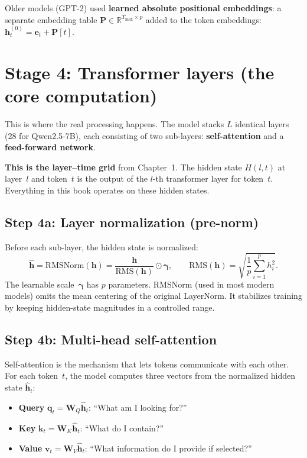\documentclass[11pt, twoside, openright]{memoir}
\begin{document}
Older models (GPT-2) used \textbf{learned absolute positional embeddings}:
a separate embedding table $\mathbf{P} \in \mathbb{R}^{T_{\max} \times p}$
added to the token embeddings:
$\mathbf{h}^{(0)}_t = \mathbf{e}_t + \mathbf{P}[t]$.

\section{Stage 4: Transformer layers (the core computation)}

This is where the real processing happens.  The model stacks $L$ identical
layers (28 for Qwen2.5-7B), each consisting of two sub-layers:
\textbf{self-attention} and a \textbf{feed-forward network}.

\begin{keyidea}
\textbf{This is the layer--time grid} from Chapter~1.  The hidden state
$H(l,t)$ at layer~$l$ and token~$t$ is the output of the $l$-th transformer
layer for token~$t$.  Everything in this book operates on these hidden
states.
\end{keyidea}

\subsection{Step 4a: Layer normalization (pre-norm)}

Before each sub-layer, the hidden state is normalized:
\[
  \hat{\mathbf{h}} = \text{RMSNorm}(\mathbf{h})
  = \frac{\mathbf{h}}{\text{RMS}(\mathbf{h})} \odot \boldsymbol{\gamma},
  \qquad
  \text{RMS}(\mathbf{h}) = \sqrt{\frac{1}{p}\sum_{i=1}^{p} h_i^2}.
\]
The learnable scale~$\boldsymbol{\gamma}$ has $p$ parameters.  RMSNorm
(used in most modern models) omits the mean centering of the original
LayerNorm.  It stabilizes training by keeping hidden-state magnitudes in
a controlled range.

\subsection{Step 4b: Multi-head self-attention}

Self-attention is the mechanism that lets tokens communicate with each other.
For each token~$t$, the model computes three vectors from the normalized
hidden state $\hat{\mathbf{h}}_t$:

\begin{itemize}[nosep]
\item \textbf{Query} $\mathbf{q}_t = \mathbf{W}_Q \hat{\mathbf{h}}_t$:
  ``What am I looking for?''
\item \textbf{Key} $\mathbf{k}_t = \mathbf{W}_K \hat{\mathbf{h}}_t$:
  ``What do I contain?''
\item \textbf{Value} $\mathbf{v}_t = \mathbf{W}_V \hat{\mathbf{h}}_t$:
  ``What information do I provide if selected?''
\end{itemize}
\end{document}
